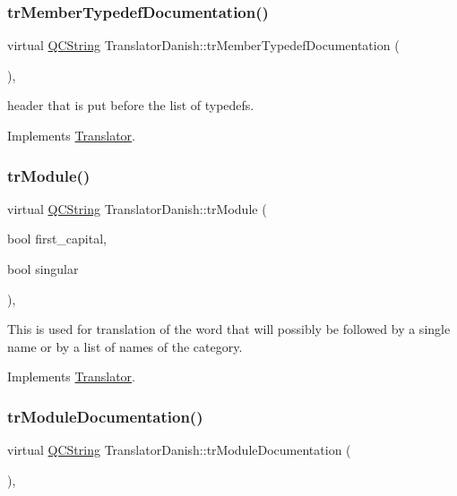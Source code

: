 \subsubsection{\texorpdfstring{trMemberTypedefDocumentation()}{trMemberTypedefDocumentation()}}
{\footnotesize\ttfamily virtual \mbox{\hyperlink{class_q_c_string}{Q\+C\+String}} Translator\+Danish\+::tr\+Member\+Typedef\+Documentation (\begin{DoxyParamCaption}{ }\end{DoxyParamCaption})\hspace{0.3cm}{\ttfamily [inline]}, {\ttfamily [virtual]}}

header that is put before the list of typedefs. 

Implements \mbox{\hyperlink{class_translator}{Translator}}.

\mbox{\label{class_translator_danish_ad668d61e95181ea0750d1e5359ce134f}} 
\subsubsection{\texorpdfstring{trModule()}{trModule()}}
{\footnotesize\ttfamily virtual \mbox{\hyperlink{class_q_c_string}{Q\+C\+String}} Translator\+Danish\+::tr\+Module (\begin{DoxyParamCaption}\item[{bool}]{first\+\_\+capital,  }\item[{bool}]{singular }\end{DoxyParamCaption})\hspace{0.3cm}{\ttfamily [inline]}, {\ttfamily [virtual]}}

This is used for translation of the word that will possibly be followed by a single name or by a list of names of the category. 

Implements \mbox{\hyperlink{class_translator}{Translator}}.

\mbox{\label{class_translator_danish_aa2e13777a125889108684d20837db889}} 
\subsubsection{\texorpdfstring{trModuleDocumentation()}{trModuleDocumentation()}}
{\footnotesize\ttfamily virtual \mbox{\hyperlink{class_q_c_string}{Q\+C\+String}} Translator\+Danish\+::tr\+Module\+Documentation (\begin{DoxyParamCaption}{ }\end{DoxyParamCaption})\hspace{0.3cm}{\ttfamily [inline]}, {\ttfamily [virtual]}}

